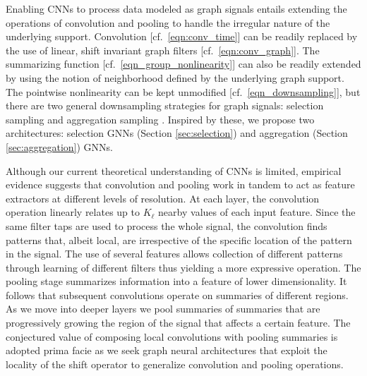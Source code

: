 Enabling CNNs to process data modeled as graph signals entails extending the operations of convolution and pooling to handle the irregular nature of the underlying support. Convolution [cf.~\eqref{eqn:conv_time}] can be readily replaced by the use of linear, shift invariant graph filters [cf.~\eqref{eqn:conv_graph}]. The summarizing function [cf.~\eqref{eqn_group_nonlinearity}] can also be readily extended by using the notion of neighborhood defined by the underlying graph support. The pointwise nonlinearity can be kept unmodified [cf.~\eqref{eqn_downsampling}], but there are two general downsampling strategies for graph signals: selection sampling \cite{chen15-selection} and aggregation sampling \cite{marques16-aggregation}. Inspired by these, we propose two architectures: selection GNNs (Section \ref{sec:selection}) and aggregation (Section \ref{sec:aggregation}) GNNs.

%
\begin{remark} \normalfont 
Although our current theoretical understanding of CNNs is limited, empirical evidence suggests that convolution and pooling work in tandem to act as feature extractors at different levels of resolution. At each layer, the convolution operation linearly relates up to $K_{\ell}$ nearby values of each input feature. Since the same filter taps are used to process the whole signal, the convolution finds patterns that, albeit local, are irrespective of the specific location of the pattern in the signal. The use of several features allows collection of different patterns through learning of different filters thus yielding a more expressive operation. The pooling stage summarizes information into a feature of lower dimensionality. It follows that subsequent convolutions operate on summaries of different regions. As we move into deeper layers we pool summaries of summaries that are progressively growing the region of the signal that affects a certain feature. The conjectured value of composing local convolutions with pooling summaries is adopted prima facie as we seek graph neural architectures that exploit the locality of the shift operator to generalize convolution and pooling operations.
\end{remark}
